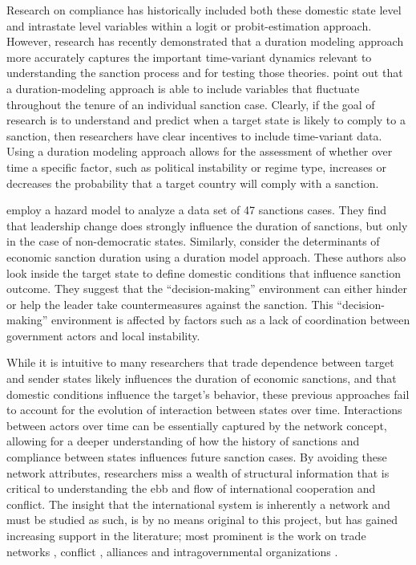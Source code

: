 Research on compliance has historically included both these domestic state level and intrastate level variables within a logit or probit-estimation approach. However, research has recently demonstrated that a duration modeling approach more accurately captures the important time-variant dynamics relevant to understanding the sanction process and for testing those theories. \cite{bolks2000} point out that a duration-modeling approach is able to include variables that fluctuate throughout the tenure of an individual sanction case. Clearly, if the goal of research is to understand and predict when a target state is likely to comply to a sanction, then researchers have clear incentives to include time-variant data. Using a duration modeling approach allows for the assessment of whether over time a specific factor, such as political instability or regime type, increases or decreases the probability that a target country will comply with a sanction.

\cite{mcgillivray2004} employ a hazard model to analyze a data set of 47 sanctions cases. They find that leadership change does strongly influence the duration of sanctions, but only in the case of non-democratic states. Similarly, \cite{bolks2000} consider the determinants of economic sanction duration using a duration model approach. These authors also look inside the target state to define domestic conditions that influence sanction outcome. They suggest that the ``decision-making'' environment can either hinder or help the leader take countermeasures against the sanction. This ``decision-making'' environment is affected by factors such as a lack of coordination between government actors and local instability. 


While it is intuitive to many researchers that trade dependence between target and sender states likely influences the duration of economic sanctions, and that domestic conditions influence the target's behavior, these previous approaches fail to account for the evolution of interaction between states over time. Interactions between actors over time can be essentially captured by the network concept, allowing for a deeper understanding of how the history of sanctions and compliance between states influences future sanction cases. By avoiding these network attributes, researchers miss a wealth of structural information that is critical to understanding the ebb and flow of international cooperation and conflict. The insight that the international system is inherently a network and must be studied as such, is by no means original to this project, but has gained increasing support in the literature; most prominent is the work on trade networks \citep{hoff2004modeling} , conflict \citep{dorff2013}, alliances \citep{warren2010geometry} and intragovernmental organizations \citep{cao2009networks,greenhill2010norm}. 

